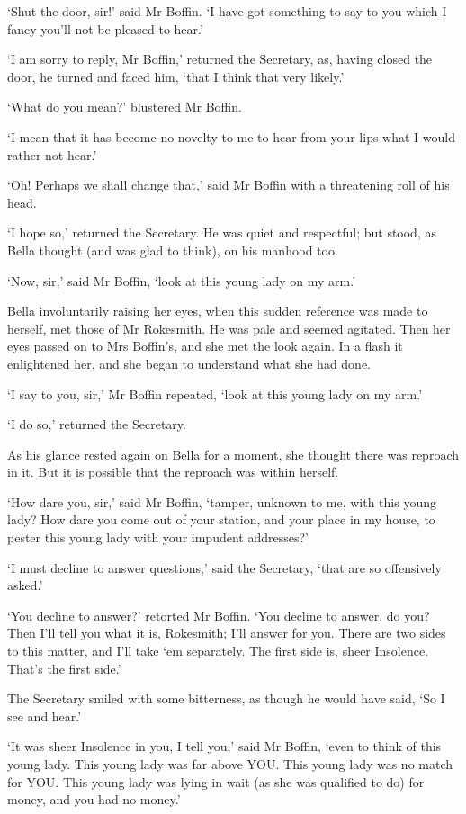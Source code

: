 ‘Shut the door, sir!’ said Mr Boffin. ‘I have got something to say to
you which I fancy you’ll not be pleased to hear.’

‘I am sorry to reply, Mr Boffin,’ returned the Secretary, as, having
closed the door, he turned and faced him, ‘that I think that very
likely.’

‘What do you mean?’ blustered Mr Boffin.

‘I mean that it has become no novelty to me to hear from your lips what
I would rather not hear.’

‘Oh! Perhaps we shall change that,’ said Mr Boffin with a threatening
roll of his head.

‘I hope so,’ returned the Secretary. He was quiet and respectful; but
stood, as Bella thought (and was glad to think), on his manhood too.

‘Now, sir,’ said Mr Boffin, ‘look at this young lady on my arm.’

Bella involuntarily raising her eyes, when this sudden reference was
made to herself, met those of Mr Rokesmith. He was pale and seemed
agitated. Then her eyes passed on to Mrs Boffin’s, and she met the look
again. In a flash it enlightened her, and she began to understand what
she had done.

‘I say to you, sir,’ Mr Boffin repeated, ‘look at this young lady on my
arm.’

‘I do so,’ returned the Secretary.

As his glance rested again on Bella for a moment, she thought there was
reproach in it. But it is possible that the reproach was within herself.

‘How dare you, sir,’ said Mr Boffin, ‘tamper, unknown to me, with this
young lady? How dare you come out of your station, and your place in my
house, to pester this young lady with your impudent addresses?’

‘I must decline to answer questions,’ said the Secretary, ‘that are so
offensively asked.’

‘You decline to answer?’ retorted Mr Boffin. ‘You decline to answer,
do you? Then I’ll tell you what it is, Rokesmith; I’ll answer for you.
There are two sides to this matter, and I’ll take ‘em separately. The
first side is, sheer Insolence. That’s the first side.’

The Secretary smiled with some bitterness, as though he would have said,
‘So I see and hear.’

‘It was sheer Insolence in you, I tell you,’ said Mr Boffin, ‘even to
think of this young lady. This young lady was far above YOU. This young
lady was no match for YOU. This young lady was lying in wait (as she was
qualified to do) for money, and you had no money.’

